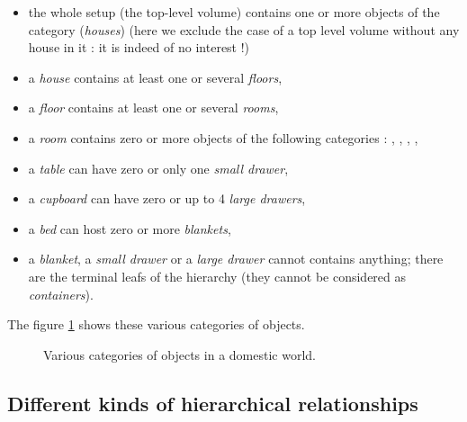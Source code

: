 \begin{itemize}
  
\item the  whole setup (the  top-level volume) contains one  or more
  objects  of  the    category  (\emph{houses})  (here  we
  exclude the case  of a top level volume without any  house in it :
  it is indeed of no interest !)
  
\item a \emph{house} contains at least one or several \emph{floors},
  
\item a \emph{floor} contains at least one or several \emph{rooms},
  
\item a \emph{room} contains zero or more objects of the following 
  categories : , , , ,
  
\item a \emph{table} can have zero or only one \emph{small drawer},
  
\item a \emph{cupboard} can have zero or up to 4 \emph{large drawers},
  
\item a \emph{bed} can host zero or more \emph{blankets},
  
\item  a  \emph{blanket}, a  \emph{small  drawer}  or a  \emph{large
  drawer} cannot contains anything;  there are the terminal leafs of
  the hierarchy (they cannot be considered as \emph{containers}).
  
\end{itemize}

\pn The figure \ref{fig:house:1} shows these various categories of objects.

\begin{figure}[h]
\begin{center}
\scalebox{1.}{}
\end{center}
\caption{Various categories of objects in a domestic world.}\label{fig:house:1}
\end{figure}

\subsection{Different kinds of hierarchical relationships}

